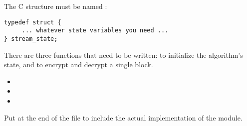 \documentclass{howto}
\begin{document}
The C structure must be named :

\begin{verbatim}
typedef struct {
     ... whatever state variables you need ...
} stream_state;
\end{verbatim}

There are three functions that need to be written: to initialize the
algorithm's state, and to encrypt and decrypt a single block.

\begin{itemize}
  \item {}
  \item {}
  \item {}
\end{itemize}

Put  at the end of the file to
include the actual implementation of the module.
\end{document}

